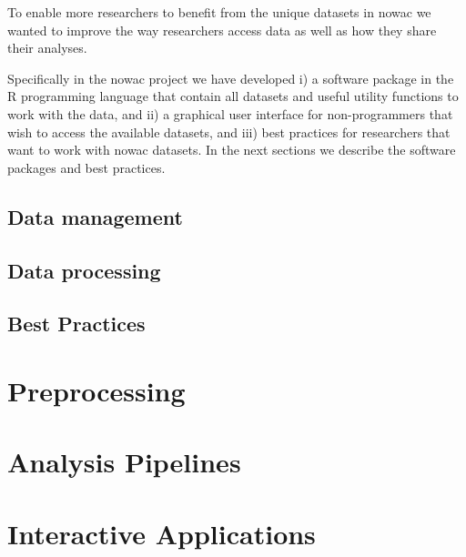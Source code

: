 To enable more researchers to benefit from the unique datasets in \gls{nowac} we
wanted to improve the way researchers access data as well as how they share
their analyses. 

Specifically in the \gls{nowac} project we have developed i) a software package
in the R programming language that contain all datasets and useful utility
functions to work with the data, and ii) a graphical user interface for
non-programmers that wish to access the available datasets, and iii) best
practices for researchers that want to work with \gls{nowac} datasets. In the
next sections we describe the software packages and best practices. 

\subsection{Data management} 

\subsection{Data processing} 

\subsection{Best Practices} 



\section{Preprocessing} 

\section{Analysis Pipelines}

\section{Interactive Applications} 
